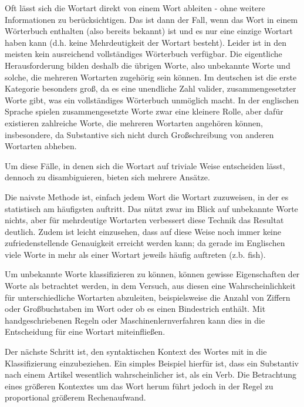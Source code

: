 \documentclass{article}
\begin{document}
\noindent{}Oft lässt sich die Wortart direkt von einem Wort ableiten - ohne weitere Informationen zu berücksichtigen. Das ist dann der Fall, wenn das Wort in einem Wörterbuch enthalten (also bereits bekannt) ist und es nur eine einzige Wortart haben kann (d.h. keine Mehrdeutigkeit der Wortart besteht).
Leider ist in den meisten kein ausreichend vollständiges Wörterbuch verfügbar. Die eigentliche Herausforderung bilden deshalb die übrigen Worte, also unbekannte Worte und solche, die mehreren Wortarten zugehörig sein können. Im deutschen ist die erste Kategorie besonders groß, da es eine unendliche Zahl valider, zusammengesetzter Worte gibt, was ein vollständiges Wörterbuch unmöglich macht. In der englischen Sprache spielen zusammengesetzte Worte zwar eine kleinere Rolle, aber dafür existieren zahlreiche Worte, die mehreren Wortarten angehören können, insbesondere, da Substantive sich nicht durch Großschreibung von anderen Wortarten abheben.%

Um diese Fälle, in denen sich die Wortart auf triviale Weise entscheiden lässt, dennoch zu disambiguieren, bieten sich mehrere Ansätze.%

Die naivste Methode ist, einfach jedem Wort die Wortart zuzuweisen, in der es statistisch am häufigsten auftritt. Das nützt zwar im Blick auf unbekannte Worte nichts, aber für mehrdeutige Wortarten verbessert diese Technik das Resultat deutlich.
Zudem ist leicht einzusehen, dass auf diese Weise noch immer keine zufriedenstellende Genauigkeit erreicht werden kann; da gerade im Englischen viele Worte in mehr als einer Wortart jeweils häufig auftreten (z.b. fish).%

Um unbekannte Worte klassifizieren zu können, können gewisse Eigenschaften der Worte als betrachtet werden, in dem Versuch, aus diesen eine Wahrscheinlichkeit für unterschiedliche Wortarten abzuleiten, beispielsweise die Anzahl von Ziffern oder Großbuchstaben im Wort oder ob es einen Bindestrich enthält. Mit handgeschriebenen Regeln oder Maschinenlernverfahren kann dies in die Entscheidung für eine Wortart miteinfließen.%

Der nächste Schritt ist, den syntaktischen Kontext des Wortes mit in die Klassifizierung einzubeziehen. Ein simples Beispiel hierfür ist, dass ein Substantiv nach einem Artikel wesentlich wahrscheinlicher ist, als ein Verb. Die Betrachtung eines größeren Kontextes um das Wort herum führt jedoch in der Regel zu proportional größerem Rechenaufwand.%
\end{document}
